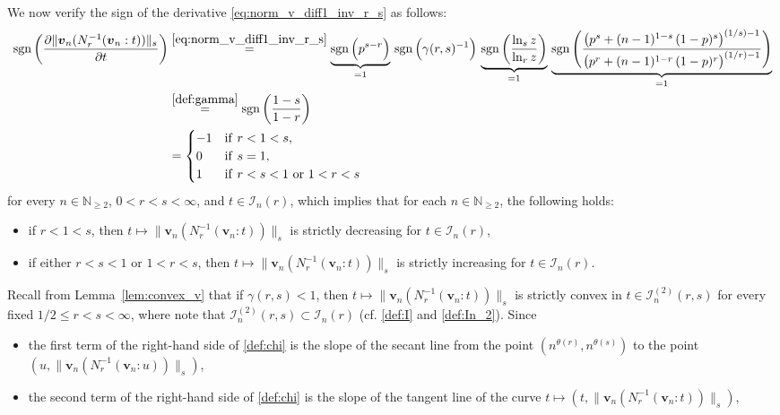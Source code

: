 \documentclass[conference, draftcls, onecolumn]{IEEEtran}
\theoremstyle{plain}
\newcommand{\bvec}[1]{\boldsymbol{#1}}
\newcommand{\sgn}{\operatorname{sgn}}
\newcommand{\lemref}[1]{Lemma~\ref{#1}}
\begin{document}
\begin{IEEEproof}[Proof of \lemref{lem:slope_v}]
We now verify the sign of the derivative \eqref{eq:norm_v_diff1_inv_r_s} as follows:
\begin{align}
\sgn\bigg( \frac{ \partial \| \bvec{v}_{n}( N_{r}^{-1}( \bvec{v}_{n} : t ) ) \|_{s} }{ \partial t } \bigg)
& \overset{\eqref{eq:norm_v_diff1_inv_r_s}}{=}
\underbrace{ \sgn\Big( p^{s-r} \Big) }_{ = 1 } \, \sgn\Big( \gamma(r, s)^{-1} \Big) \, \underbrace{ \sgn\bigg( \frac{ \ln_{s} z }{ \ln_{r} z } \bigg) }_{ = 1 } \, \underbrace{ \sgn\Bigg( \frac{ \big( p^{s} + (n-1)^{1-s} \, (1-p)^{s} \big)^{(1/s)-1} }{ \big( p^{r} + (n-1)^{1-r} \, (1-p)^{r} \big)^{(1/r)-1} } \Bigg) }_{ = 1 }
\\
& \overset{\eqref{def:gamma}}{=}
\sgn\bigg( \frac{ 1 - s }{ 1 - r } \bigg)
\\
& =
\begin{cases}
-1
& \mathrm{if} \ r < 1 < s ,
\\
0
& \mathrm{if} \ s = 1 ,
\\
1
& \mathrm{if} \ r < s < 1 \ \mathrm{or} \ 1 < r < s
\end{cases}
\end{align}
for every $n \in \mathbb{N}_{\ge 2}$, $0 < r < s < \infty$, and $t \in \mathcal{I}_{n}( r )$, which implies that for each $n \in \mathbb{N}_{\ge 2}$, the following holds:
\begin{itemize}
\item
if $r < 1 < s$, then $t \mapsto \| \bvec{v}_{n}( N_{r}^{-1}( \bvec{v}_{n} : t ) ) \|_{s}$ is strictly decreasing for $t \in \mathcal{I}_{n}( r )$,
\item
if either $r < s <  1$ or $1 < r < s$, then $t \mapsto \| \bvec{v}_{n}( N_{r}^{-1}( \bvec{v}_{n} : t ) ) \|_{s}$ is strictly increasing for $t \in \mathcal{I}_{n}( r )$.
\end{itemize}
Recall from \lemref{lem:convex_v} that if $\gamma( r, s ) < 1$, then $t \mapsto \| \bvec{v}_{n}( N_{r}^{-1}( \bvec{v}_{n} : t )) \|_{s}$ is strictly convex in $t \in \mathcal{I}_{n}^{(2)}( r, s )$ for every fixed $1/2 \le r < s < \infty$, where note that $\mathcal{I}_{n}^{(2)}( r, s ) \subset \mathcal{I}_{n}( r )$ (cf. \eqref{def:I} and \eqref{def:In_2}).
Since
\begin{itemize}
\item
the first term of the right-hand side of \eqref{def:chi} is the slope of the secant line from the point $(n^{\theta( r )}, n^{\theta( s )})$ to the point $(u, \| \bvec{v}_{n}(N_{r}^{-1}( \bvec{v}_{n} : u )) \|_{s})$,
\item
the second term of the right-hand side of \eqref{def:chi} is the slope of the tangent line of the curve $t \mapsto (t, \| \bvec{v}_{n}( N_{r}^{-1}( \bvec{v}_{n} : t ) ) \|_{s})$,

\end{itemize}
\end{IEEEproof}
\end{document}
